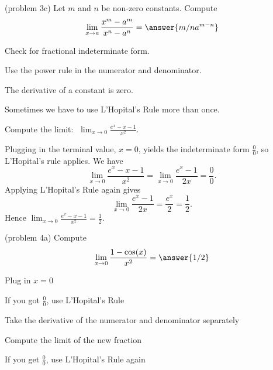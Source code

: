 \documentclass[handout]{ximera}
\begin{document}
\begin{problem}(problem 3c)
  Let $m$ and $n$ be non-zero constants. Compute
  \[
  \lim_{x \to a} \frac{x^m - a^m}{x^n - a^n} = \answer{m/n a^{m-n}}
  \]
  
    \begin{hint}
      Check for fractional indeterminate form.
    \end{hint}
    \begin{hint}
      Use the power rule in the numerator and denominator.
    \end{hint}
	  \begin{hint}
      The derivative of a constant is zero.
    \end{hint}
  
\end{problem}



Sometimes we have to use L'Hopital's Rule more than once.

\begin{example}[example 4]
Compute the limit:  $\displaystyle{\;\lim_{x \to 0} \frac{e^x - x - 1}{x^2}}.$

Plugging in the terminal value, $x=0$, yields 
the indeterminate form $\frac00$, so L'Hopital's rule applies.
We have 
\[\lim_{x \to 0} \frac{e^x - x - 1}{x^2} = \lim_{x \to 0} \frac{e^x -1}{2x} = \frac{0}{0}.\]
Applying L'Hopital's Rule again gives
\[\lim_{x \to 0} \frac{e^x -1}{2x} = \frac{e^x}{2} = \frac{1}{2}.\]
Hence $\displaystyle{\lim_{x \to 0} \frac{e^x - x - 1}{x^2} = \frac 12}.$
\end{example}


\begin{problem}(problem 4a)
  Compute
  \[
  \lim_{x \to 0} \frac{1 - \cos(x)}{x^2} = \answer{1/2}
  \]
  
    \begin{hint}
      Plug in $x=0$
    \end{hint}
    \begin{hint}
      If you got $\frac00$, use L'Hopital's Rule
    \end{hint}
    \begin{hint}
      Take the derivative of the numerator and denominator separately
    \end{hint}
	  \begin{hint}
      Compute the limit of the new fraction
    \end{hint}
		\begin{hint}
		 If you get $\frac00$, use L'Hopital's Rule again
    \end{hint}

	
\end{problem}
\end{document}
